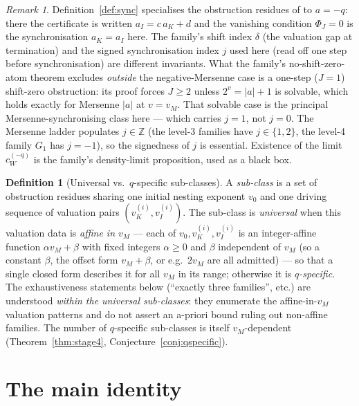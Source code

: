 \documentclass[11pt,reqno]{amsart}
\theoremstyle{plain}
\theoremstyle{definition}
\newtheorem{definition}[theorem]{Definition}
\theoremstyle{remark}
\newtheorem{remark}[theorem]{Remark}
\newcommand{\Z}{\mathbb{Z}}
\newcommand{\vk}{v_{K}}
\newcommand{\vi}{v_{I}}
\newcommand{\aK}{a_{K}}
\newcommand{\aI}{a_{I}}
\newcommand{\vM}{v_{M}}
\newcommand{\cWq}{c_{W}^{(-q)}}
\begin{document}
\begin{remark}
Definition~\ref{def:sync} specialises the obstruction residues of
\cite{ObstructionResiduesFamily2026} to $a = -q$: there the certificate is
written $\aI = c\,\aK + d$ and the vanishing condition $\Phi_J = 0$ is the
synchronisation $\aK = \aI$ here. The family's shift index $\delta$ (the
valuation gap at termination) and the signed synchronisation index $j$ used
here (read off one step before synchronisation) are different invariants.
What the family's no-shift-zero-atom theorem excludes \emph{outside} the
negative-Mersenne case is a one-step ($J = 1$) shift-zero obstruction: its
proof forces $J \ge 2$ unless $2^v = \lvert a \rvert + 1$ is solvable, which
holds exactly for Mersenne $\lvert a \rvert$ at $v = \vM$. That solvable case
is the principal Mersenne-synchronising class here --- which carries
$j = 1$, not $j = 0$. The Mersenne ladder populates $j \in \Z$ (the level-3 families have
$j \in \{1, 2\}$, the level-4 family $G_1$ has $j = -1$), so the signedness
of $j$ is essential. Existence of the limit $\cWq$ is the family's
density-limit proposition, used as a black box.
\end{remark}

\begin{definition}[Universal vs.\ $q$-specific sub-classes]\label{def:universal}
A \emph{sub-class} is a set of obstruction residues sharing one initial
nesting exponent $v_0$ and one driving sequence of valuation pairs
$(\vk^{(i)}, \vi^{(i)})$. The sub-class is \emph{universal} when this
valuation data is \emph{affine in $\vM$} --- each of $v_0, \vk^{(i)},
\vi^{(i)}$ is an integer-affine function $\alpha\vM + \beta$ with fixed
integers $\alpha \ge 0$ and $\beta$ independent of $\vM$ (so a constant
$\beta$, the offset form $\vM + \beta$, or e.g.\ $2\vM$ are all admitted)
--- so that a single closed form describes it for all $\vM$ in its range;
otherwise it is \emph{$q$-specific}. The exhaustiveness statements below
(``exactly three families'', etc.) are understood \emph{within the universal
sub-classes}: they enumerate the affine-in-$\vM$ valuation patterns and do
not assert an a-priori bound ruling out non-affine families. The number of
$q$-specific sub-classes is itself $\vM$-dependent
(Theorem~\ref{thm:stage4}, Conjecture~\ref{conj:qspecific}).
\end{definition}

\section{The main identity}\label{sec:identity}
\end{document}
